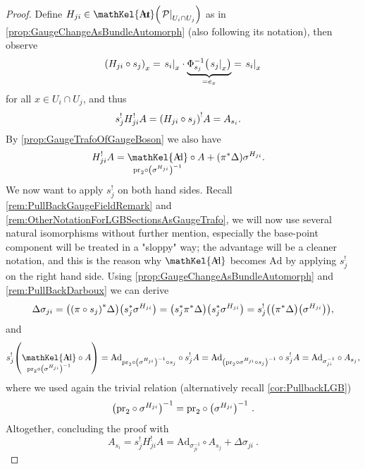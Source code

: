 \documentclass[reqno,a4paper,oneside]{amsart}
\theoremstyle{plain}
\theoremstyle{remark}
\theoremstyle{definition}
\DeclareMathOperator{\sAut}{\mathKel{A\mkern-5.5mu u\mkern-4mu t\mkern-1.5mu}}
\DeclareMathOperator{\sAd}{\mathKel{A\mkern-5.5mu d}}
\begin{document}
\begin{proof}
\leavevmode\newline
Define $H_{ji} \in \sAut\mleft( \mleft.\mathcal{P}\mright|_{U_i \cap U_j} \mright)$ as in \ref{prop:GaugeChangeAsBundleAutomorph} (also following its notation), then observe
\begin{equation*}
\mleft(H_{ji} \circ s_j\mright)_x
=
\mleft.s_i\mright|_x \cdot {\underbrace{\Phi^{-1}_{s_j}\mleft( \mleft.s_j\mright|_x \mright)}_{= e_x}}
=
\mleft.s_i\mright|_x
\end{equation*}
for all $x \in U_i \cap U_j$, and thus
\begin{align*}
s_j^! H_{ji}^!A
&=
\mleft( H_{ji} \circ s_j \mright)^!A
=
A_{s_i}.
\end{align*}
By \ref{prop:GaugeTrafoOfGaugeBoson} we also have
\begin{align*}
H_{ji}^!A
&=
{\sAd_{\mathrm{pr}_2\circ\mleft(\sigma^{H_{ji}}\mright)^{-1}}} \circ A
	+ \mleft(\pi^*\Delta\mright)\sigma^{H_{ji}}.
\end{align*}
We now want to apply $s_j^!$ on both hand sides.
Recall \ref{rem:PullBackGaugeFieldRemark} and \ref{rem:OtherNotationForLGBSectionsAsGaugeTrafo}, we will now use several natural isomorphisms without further mention, especially the base-point component will be treated in a "sloppy" way; the advantage will be a cleaner notation, and this is the reason why $\sAd$ becomes $\mathrm{Ad}$ by applying $s_j^!$ on the right hand side.
Using \ref{prop:GaugeChangeAsBundleAutomorph} and \ref{rem:PullBackDarboux} we can derive
\begin{equation*}
\Delta \sigma_{ji}
=
\bigl( \mleft(\pi \circ s_j\mright)^* \Delta \bigr)\mleft( s_j^*\sigma^{H_{ji}} \mright)
=
\bigl( s_j^*\pi^* \Delta \bigr)\mleft( s_j^*\sigma^{H_{ji}} \mright)
=
s_j^!\mleft(\bigl( \pi^* \Delta \bigr)\mleft( \sigma^{H_{ji}} \mright)\mright),
\end{equation*}
and
\begin{equation*}
s_j^!\mleft( {\sAd_{\mathrm{pr}_2\circ\mleft(\sigma^{H_{ji}}\mright)^{-1}}} \circ A \mright)
=
{\mathrm{Ad}_{\mathrm{pr}_2\circ\mleft(\sigma^{H_{ji}}\mright)^{-1}\circ s_j}} \circ s_j^!A
=
{\mathrm{Ad}_{\mleft(\mathrm{pr}_2\circ\sigma^{H_{ji}}\circ s_j\mright)^{-1}}} \circ s_j^!A
=
{\mathrm{Ad}_{\sigma_{ji}^{-1}}} \circ A_{s_j},
\end{equation*}
where we used again the trivial relation (alternatively recall \ref{cor:PullbackLGB})
\begin{equation*}
\mleft(\mathrm{pr}_2 \circ \sigma^{H_{ji}} \mright)^{-1}
=
\mathrm{pr}_2 \circ \mleft(\sigma^{H_{ji}}\mright)^{-1}~.
\end{equation*}
Altogether, concluding the proof with
\begin{equation*}
A_{s_i}
=
s_j^! H_{ji}^!A
=
{\mathrm{Ad}_{\sigma_{ji}^{-1}}} \circ A_{s_j}
	+ \Delta \sigma_{ji}~.
\end{equation*}
\end{proof}
\end{document}
